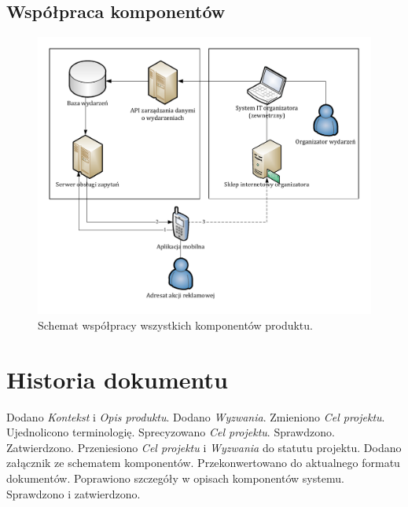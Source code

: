 \documentclass[10pt]{dokument-ppi}
\begin{document}
\subsection{Współpraca komponentów}
\begin{figure}[h!]
    \includegraphics[width=\textwidth]{./figury/schemat-komponentow}
    \caption{Schemat współpracy wszystkich komponentów produktu.}
    \label{fig:schemat_komponentow}
\end{figure}


\newpage
\section*{Historia dokumentu}
\begin{versions}
        Dodano \emph{Kontekst} i \emph{Opis produktu}.
        Dodano \emph{Wyzwania}.
        Zmieniono \emph{Cel projektu}.
        Ujednolicono terminologię. Sprecyzowano \emph{Cel projektu}.
        Sprawdzono.
        Zatwierdzono.
        Przeniesiono \emph{Cel projektu} i \emph{Wyzwania} do statutu projektu.
        Dodano załącznik ze schematem komponentów.
        Przekonwertowano do aktualnego formatu dokumentów.
        Poprawiono szczegóły w opisach komponentów systemu.
        Sprawdzono i zatwierdzono.
\end{versions}
\end{document}
